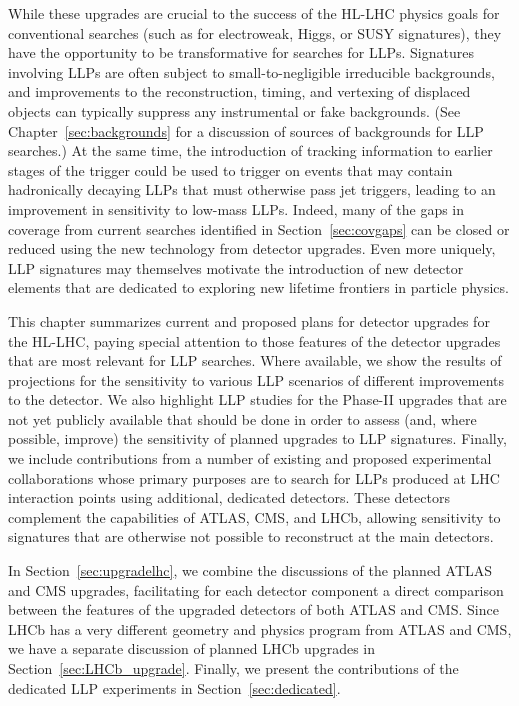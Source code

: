 While these upgrades are crucial to the success of the HL-LHC physics goals for conventional searches (such as for electroweak, Higgs, or SUSY signatures), they have the opportunity to be transformative for searches for LLPs. Signatures involving LLPs are often subject to small-to-negligible irreducible backgrounds, and improvements to the reconstruction, timing, and vertexing of displaced objects can typically suppress any instrumental or fake backgrounds. (See Chapter~\ref{sec:backgrounds} for a discussion of sources of backgrounds for LLP searches.) At the same time, the introduction of tracking information to earlier stages of the trigger could be used to trigger on events that may contain hadronically decaying LLPs that must otherwise pass jet triggers, leading to an improvement in sensitivity to low-mass LLPs. Indeed, many of the gaps in coverage from current searches identified in Section~\ref{sec:covgaps} can be closed or reduced using the new technology from detector upgrades. Even more uniquely, LLP signatures may themselves motivate the introduction of new detector elements that are dedicated to exploring new lifetime frontiers in particle physics.

This chapter summarizes current and proposed plans for detector upgrades for the HL-LHC, paying special attention to those features of the detector upgrades that are most relevant for LLP searches. Where available, we show the results of projections for the sensitivity to various LLP scenarios of different improvements to the detector. We also highlight LLP studies for the Phase-II upgrades that are not yet publicly available that should be done in order to assess (and, where possible, improve) the sensitivity of planned upgrades to LLP signatures. Finally, we include contributions from a number of existing and proposed experimental collaborations whose primary purposes are to search for LLPs produced at LHC interaction points using additional, dedicated detectors. These detectors complement the capabilities of ATLAS, CMS, and LHCb, allowing sensitivity to signatures that are otherwise not possible to reconstruct at the main detectors.

In Section~\ref{sec:upgradelhc}, we combine the discussions of the planned ATLAS and CMS upgrades, facilitating for each detector component a direct comparison between the features of the upgraded detectors of both ATLAS and CMS. Since LHCb has a very different geometry and physics program from ATLAS and CMS, we have a separate discussion of planned LHCb upgrades in Section~\ref{sec:LHCb_upgrade}. Finally, we present the contributions of the dedicated LLP experiments in Section~\ref{sec:dedicated}.






